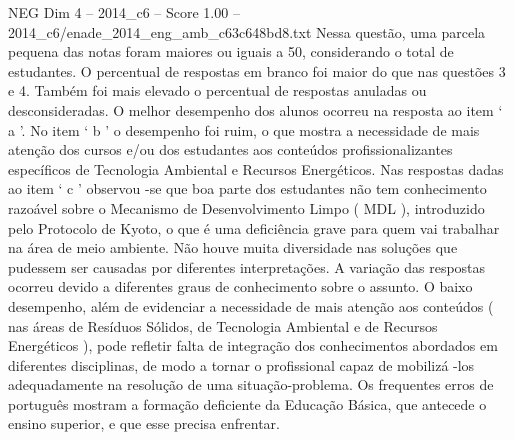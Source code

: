 \begin{textsample}{NEG Dim 4 – 2014\_c6 – Score 1.00 – 2014\_c6/enade\_2014\_eng\_amb\_c63c648bd8.txt}
Nessa questão, uma parcela pequena das notas foram maiores ou iguais a 50, considerando o total de estudantes.
O percentual de respostas em branco foi maior do que nas questões 3 e 4.
Também foi mais elevado o percentual de respostas anuladas ou desconsideradas.
O melhor desempenho dos alunos ocorreu na resposta ao item ‘ a ’.
No item ‘ b ’ o desempenho foi ruim, o que mostra a necessidade de mais atenção dos cursos e/ou dos estudantes aos conteúdos profissionalizantes específicos de Tecnologia Ambiental e Recursos Energéticos.
Nas respostas dadas ao item ‘ c ’ observou -se que boa parte dos estudantes não tem conhecimento razoável sobre o Mecanismo de Desenvolvimento Limpo ( MDL ), introduzido pelo Protocolo de Kyoto, o que é uma deficiência grave para quem vai trabalhar na área de meio ambiente.
Não houve muita diversidade nas soluções que pudessem ser causadas por diferentes interpretações.
A variação das respostas ocorreu devido a diferentes graus de conhecimento sobre o assunto.
O baixo desempenho, além de evidenciar a necessidade de mais atenção aos conteúdos ( nas áreas de Resíduos Sólidos, de Tecnologia Ambiental e de Recursos Energéticos ), pode refletir falta de integração dos conhecimentos abordados em diferentes disciplinas, de modo a tornar o profissional capaz de mobilizá -los adequadamente na resolução de uma situação-problema.
Os frequentes erros de português mostram a formação deficiente da Educação Básica, que antecede o ensino superior, e que esse precisa enfrentar.

\end{textsample}

